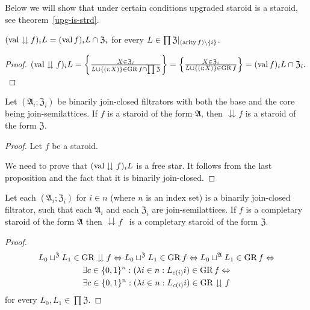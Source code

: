 Below we will show that under certain conditions upgraded staroid
is a staroid, see theorem~\ref{upg-is-strd}.
\begin{prop}
$(\operatorname{val}\downdownarrows f)_{i}L=(\operatorname{val} f)_{i}L\cap\mathfrak{Z}_{i}$
for every $L\in\prod\mathfrak{Z}|_{(\operatorname{arity} f)\setminus\{i\}}$.\end{prop}
\begin{proof}
$(\operatorname{val}\downdownarrows f)_{i}L=\left\{ \frac{X\in\mathfrak{Z}_{i}}{L\cup\{(i;X)\}\in\operatorname{GR} f\cap\prod\mathfrak{Z}}\right\}=\left\{ \frac{X\in\mathfrak{Z}_{i}}{L\cup\{(i;X)\}\in\operatorname{GR} f}\right\}=(\operatorname{val} f)_{i}L\cap\mathfrak{Z}_{i}.$\end{proof}
\begin{prop}
\label{down-staroid}Let $(\mathfrak{A}_{i};\mathfrak{Z}_{i})$ be
binarily join-closed filtrators with both the base and the core being
join-semilattices. If $f$ is a staroid of the form $\mathfrak{A}$,
then $\downdownarrows f$ is a staroid of the form $\mathfrak{Z}$.\end{prop}
\begin{proof}
Let $f$ be a staroid.

We need to prove that $(\operatorname{val}\downdownarrows f)_{i}L$ is a free star.
It follows from the last proposition and the fact that it is binarily
join-closed.\end{proof}
\begin{prop}
Let each $(\mathfrak{A}_{i};\mathfrak{Z}_{i})$ for $i\in n$ (where
$n$ is an index set) is a binarily join-closed filtrator, such that
each $\mathfrak{A}_{i}$ and each $\mathfrak{Z}_{i}$ are join-semilattices.
If $f$ is a completary staroid of the form $\mathfrak{A}$ then $\downdownarrows f$
\ is a completary staroid of the form $\mathfrak{Z}$.\end{prop}
\begin{proof}
~
\begin{multline*}
L_{0}\sqcup^{\mathfrak{Z}}L_{1}\in\operatorname{GR}\downdownarrows f\Leftrightarrow L_{0}\sqcup^{\mathfrak{Z}}L_{1}\in\operatorname{GR} f\Leftrightarrow L_{0}\sqcup^{\mathfrak{A}}L_{1}\in\operatorname{GR} f\Leftrightarrow\\
\exists c\in\{0,1\}^{n}:(\lambda i\in n:L_{c(i)}i)\in\operatorname{GR} f\Leftrightarrow\\
\exists c\in\{0,1\}^{n}:(\lambda i\in n:L_{c(i)}i)\in\operatorname{GR}\downdownarrows f
\end{multline*}
 for every $L_{0},L_{1}\in\prod\mathfrak{Z}$.
\end{proof}

